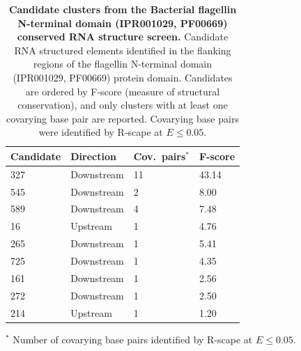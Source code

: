 \begin{table}[H]
\centering
\footnotesize
\caption[Candidate clusters from the flagellin Screen]{\textbf{Candidate clusters from the Bacterial flagellin N-terminal domain (IPR001029, PF00669) conserved RNA structure screen.}
    Candidate RNA structured elements identified in the flanking regions of the flagellin N-terminal domain (IPR001029, PF00669) protein domain. 
    Candidates are ordered by F-score (measure of structural conservation), and only clusters with at least one covarying base pair are reported. 
    Covarying base pairs were identified by R-scape at $E \le 0.05$.}
\label{tab:flagellin_appendix}
\begin{tabular}{p{}p{}p{}p{}}
\hline
\textbf{Candidate} & \textbf{Direction} & \textbf{Cov.\ pairs$^{*}$} &  \textbf{F-score} \\
\hline
327 & Downstream & 11 & 43.14 \\
545 & Downstream & 2  & 8.00 \\
589 & Downstream & 4 & 7.48 \\
16  & Upstream   & 1 & 4.76 \\
265 & Downstream & 1  & 5.41 \\
725 & Downstream & 1  & 4.35 \\
161 & Downstream & 1  & 2.56 \\
272 & Downstream & 1  & 2.50 \\
214 & Upstream   & 1  & 1.20 \\
\hline
\end{tabular}

\par\smallskip
\begin{minipage}{\textwidth}
\raggedright
$^{*}$ Number of covarying base pairs identified by R-scape at $E \le 0.05$.
\end{minipage}
\end{table}